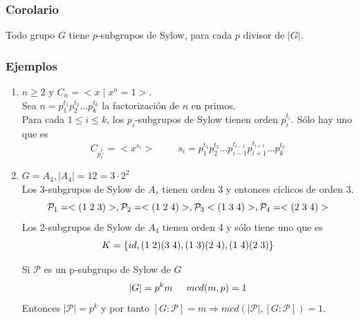 \documentclass[11pt,a4paper]{article}
\begin{document}
\subsubsection*{Corolario}

Todo grupo $G$ tiene $p$-subgrupos de Sylow, para cada $p$ divisor de $|G|$.

\subsubsection*{Ejemplos}

\begin{enumerate}[label = \arabic*)]
\item $n \geq 2$ y $C_{n} = <x \mid x^{n} = 1>$. \\
Sea $n = p_{1}^{t_{1}}p_{2}^{t_{2}}...p_{k}^{t_{k}}$ la factorización de $n$ en primos. \\
Para cada $1 \leq i \leq k$, los $p_{i}$-subgrupos de Sylow tienen orden $p_{i}^{t_{i}}$. Sólo hay uno que es
$$C_{p_{i}^{t_{i}}} = <x^{s_{i}}>\hspace{1cm} s_{i} = p_{1}^{t_{1}}p_{2}^{t_{2}}...p_{i-1}^{t_{i-1}}p_{i+1}^{t_{i+1}}...p_{k}^{t_{k}}$$
\item $G = A_{4}, |A_{4}| = 12 = 3 \cdot 2^{2}$ \\
Los 3-subgrupos de Sylow de $A_{r}$ tienen orden 3 y entonces cíclicos de orden 3.
$$\mathcal{P}_{1} = <(1 \hspace{0.1cm} 2 \hspace{0.1cm} 3)>, \mathcal{P}_{2} = <(1 \hspace{0.1cm} 2 \hspace{0.1cm} 4)>, \mathcal{P}_{3} <(1 \hspace{0.1cm} 3 \hspace{0.1cm} 4)>, \mathcal{P}_{4} = <(2 \hspace{0.1cm} 3 \hspace{0.1cm} 4)>$$
Los 2-subgrupos de Sylow de $A_{4}$ tienen orden 4 y sólo tiene uno que es
$$K = \{id, (1 \hspace{0.1cm} 2)(3 \hspace{0.1cm} 4), (1 \hspace{0.1cm} 3)(2 \hspace{0.1cm} 4), (1 \hspace{0.1cm} 4)(2 \hspace{0.1cm} 3)\}$$

Si $\mathcal{P}$ es un p-subgrupo de Sylow de $G$
$$|G| = p^{k}m \hspace{0.5cm} mcd(m, p) = 1$$
Entonces $|\mathcal{P}| = p^{k}$ y por tanto $[G:\mathcal{P}] = m \Rightarrow mcd(|\mathcal{P}|, [G:\mathcal{P}]) = 1$.
\end{enumerate}
\end{document}
